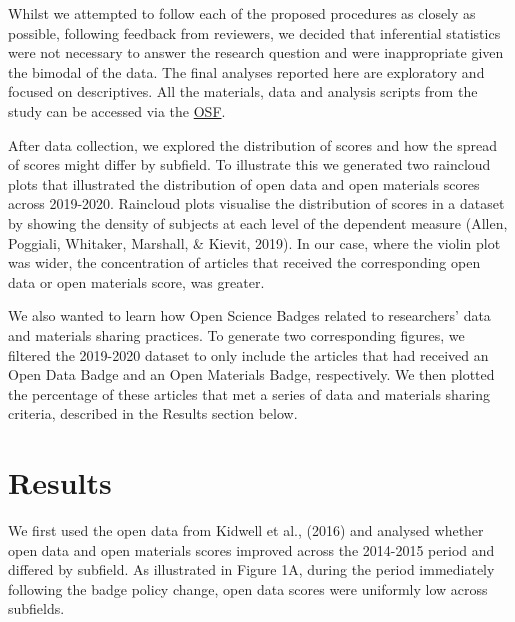 \documentclass[
  english,
  man,floatsintext]{apa6}
\begin{document}
Whilst we attempted to follow each of the proposed procedures as closely as possible, following feedback from reviewers, we decided that inferential statistics were not necessary to answer the research question and were inappropriate given the bimodal of the data. The final analyses reported here are exploratory and focused on descriptives. All the materials, data and analysis scripts from the study can be accessed via the \href{https://osf.io/z8b7j/?view_only=b97cd4c4f6d645bc9e8870d97b6f3da4}{OSF}.

After data collection, we explored the distribution of scores and how the spread of scores might differ by subfield. To illustrate this we generated two raincloud plots that illustrated the distribution of open data and open materials scores across 2019-2020. Raincloud plots visualise the distribution of scores in a dataset by showing the density of subjects at each level of the dependent measure (Allen, Poggiali, Whitaker, Marshall, \& Kievit, 2019). In our case, where the violin plot was wider, the concentration of articles that received the corresponding open data or open materials score, was greater.

We also wanted to learn how Open Science Badges related to researchers' data and materials sharing practices. To generate two corresponding figures, we filtered the 2019-2020 dataset to only include the articles that had received an Open Data Badge and an Open Materials Badge, respectively. We then plotted the percentage of these articles that met a series of data and materials sharing criteria, described in the Results section below.

\hypertarget{results}{%
\section{Results}\label{results}}

We first used the open data from Kidwell et al., (2016) and analysed whether open data and open materials scores improved across the 2014-2015 period and differed by subfield. As illustrated in Figure 1A, during the period immediately following the badge policy change, open data scores were uniformly low across subfields.
\end{document}
